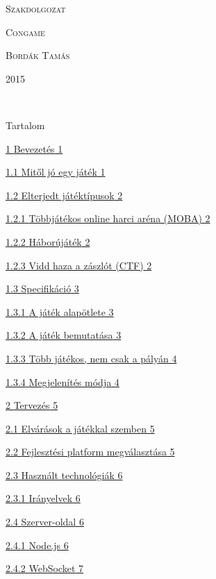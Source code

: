 \documentclass[]{article}
\date{}
\begin{document}
\textsc{Szakdolgozat}

\textsc{Congame}

\textsc{Bordák Tamás}

\textsc{2015}

\textsc{\\
}

Tartalom

\protect\hyperlink{bevezetuxe9s}{{1} {Bevezetés} 1}

\protect\hyperlink{mitux151l-juxf3-egy-juxe1tuxe9k}{{1.1} {Mitől jó egy
játék} 1}

\protect\hyperlink{elterjedt-juxe1tuxe9ktuxedpusok}{{1.2} {Elterjedt
játéktípusok} 2}

\protect\hyperlink{tuxf6bbjuxe1tuxe9kos-online-harci-aruxe9na-moba}{{1.2.1}
{Többjátékos online harci aréna (MOBA)} 2}

\protect\hyperlink{huxe1boruxfajuxe1tuxe9k}{{1.2.2} {Háborújáték} 2}

\protect\hyperlink{vidd-haza-a-zuxe1szluxf3t-ctf}{{1.2.3} {Vidd haza a
zászlót (CTF)} 2}

\protect\hyperlink{specifikuxe1ciuxf3}{{1.3} {Specifikáció} 3}

\protect\hyperlink{a-juxe1tuxe9k-alapuxf6tlete}{{1.3.1} {A játék
alapötlete} 3}

\protect\hyperlink{a-juxe1tuxe9k-bemutatuxe1sa}{{1.3.2} {A játék
bemutatása} 3}

\protect\hyperlink{tuxf6bb-juxe1tuxe9kos-nem-csak-a-puxe1lyuxe1n}{{1.3.3}
{Több játékos, nem csak a pályán} 4}

\protect\hyperlink{megjelenuxedtuxe9s-muxf3dja}{{1.3.4} {Megjelenítés
módja} 4}

\protect\hyperlink{tervezuxe9s}{{2} {Tervezés} 5}

\protect\hyperlink{elvuxe1ruxe1sok-a-juxe1tuxe9kkal-szemben}{{2.1}
{Elvárások a játékkal szemben} 5}

\protect\hyperlink{fejlesztuxe9si-platform-megvuxe1lasztuxe1sa}{{2.2}
{Fejlesztési platform megválasztása} 5}

\protect\hyperlink{hasznuxe1lt-technoluxf3giuxe1k}{{2.3} {Használt
technológiák} 6}

\protect\hyperlink{iruxe1nyelvek}{{2.3.1} {Irányelvek} 6}

\protect\hyperlink{szerver-oldal}{{2.4} {Szerver-oldal} 6}

\protect\hyperlink{node.js}{{2.4.1} {Node.js} 6}

\protect\hyperlink{websocket}{{2.4.2} {WebSocket} 7}
\end{document}
